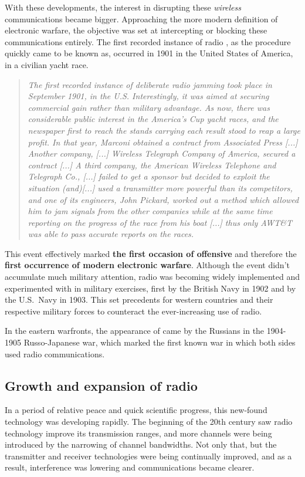 \documentclass[english,purist]{ist-report}
\begin{document}
With these developments, the interest in disrupting these \textit{wireless} communications became bigger. Approaching the more modern definition of electronic warfare, the objective was set at intercepting or blocking these communications entirely. The first recorded instance of radio \jamming{}, as the procedure quickly came to be known as, occurred in 1901 in the United States of America, in a civilian yacht race.
\begin{quote}\itshape
    The first recorded instance of deliberate radio jamming took place in September 1901, in the U.S. Interestingly, it was aimed at securing commercial gain rather than military advantage. As now, there was considerable public interest in the America’s Cup yacht races, and the newspaper first to reach the stands carrying each result stood to reap a large profit. In that year, Marconi obtained a contract from Associated Press [...] Another company, [...] Wireless Telegraph Company of America, secured a contract [...] A third company, the American Wireless Telephone and Telegraph Co., [...] failed to get a sponsor but decided to exploit the situation (and)[...] used a transmitter more powerful than its competitors, and one of its engineers, John Pickard, worked out a method which allowed him to jam signals from the other companies while at the same time reporting on the progress of the race from his boat [...] thus only AWT\&T was able to pass accurate reports on the races. \cite{alican2006}
\end{quote}
This event effectively marked \textbf{the first occasion of offensive \jamming{}} and therefore the \textbf{first occurrence of modern electronic warfare}. Although the event didn't accumulate much military attention, radio \jamming{} was becoming widely implemented and experimented with in military exercises, first by the British Navy in 1902 and by the U.S.\ Navy in 1903. This set precedents for western countries and their respective military forces to counteract the ever-increasing use of radio.

In the eastern warfronts, the appearance of \jamming{} came by the Russians in the 1904-1905 Russo-Japanese war, which marked the first known war in which both sides used radio communications.

\subsection{Growth and expansion of radio}

In a period of relative peace and quick scientific progress, this new-found technology was developing rapidly. The beginning of the 20th century saw radio technology improve its transmission ranges, and more channels were being introduced by the narrowing of channel bandwidths. Not only that, but the transmitter and receiver technologies were being continually improved, and as a result, interference was lowering and communications became clearer.
\end{document}
